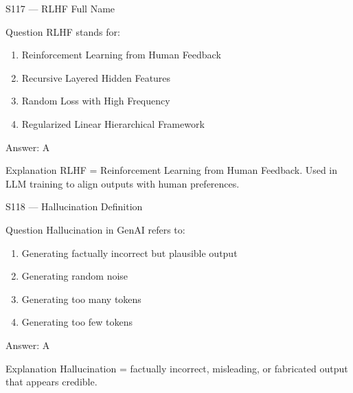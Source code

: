 \documentclass[aspectratio=169,8pt]{beamer}
\begin{document}
	\begin{frame}{S117 --- RLHF Full Name}
		\begin{block}{Question}
			RLHF stands for:
			\begin{enumerate}
				\item Reinforcement Learning from Human Feedback
				\item Recursive Layered Hidden Features
				\item Random Loss with High Frequency
				\item Regularized Linear Hierarchical Framework
			\end{enumerate}
		\end{block}
		\begin{exampleblock}{Answer: A}\end{exampleblock}
		\begin{block}{Explanation}
			RLHF = Reinforcement Learning from Human Feedback. Used in LLM training to align outputs with human preferences.
		\end{block}
	\end{frame}
	
	\begin{frame}{S118 --- Hallucination Definition}
		\begin{block}{Question}
			Hallucination in GenAI refers to:
			\begin{enumerate}
				\item Generating factually incorrect but plausible output
				\item Generating random noise
				\item Generating too many tokens
				\item Generating too few tokens
			\end{enumerate}
		\end{block}
		\begin{exampleblock}{Answer: A}\end{exampleblock}
		\begin{block}{Explanation}
			Hallucination = factually incorrect, misleading, or fabricated output that appears credible.
		\end{block}
	\end{frame}
	
\end{document}
